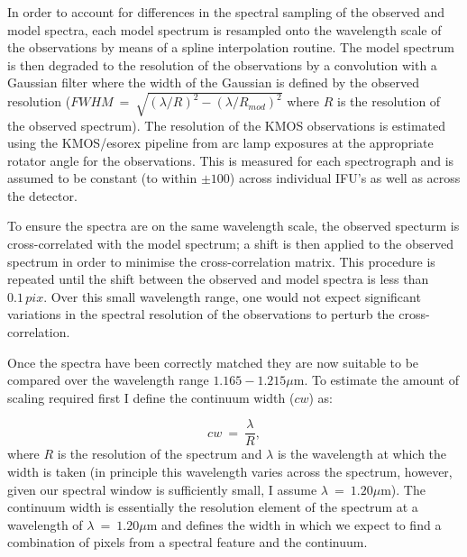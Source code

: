 In order to account for differences in the spectral sampling of the observed and model spectra,
each model spectrum is resampled onto the wavelength scale of the observations by means of a spline interpolation routine.
The model spectrum is then degraded to the resolution of the observations by a
convolution with a Gaussian filter where the width of the Gaussian is defined by the observed resolution ($FWHM~=~\sqrt{(\lambda/R)^{2} -(\lambda/R_{mod})^{2}}$ where $R$ is the resolution of the observed spectrum).
The resolution of the KMOS observations is estimated using the KMOS/esorex pipeline from arc lamp exposures at the appropriate rotator angle for the observations.
This is measured for each spectrograph and is assumed to be constant (to within $\pm 100$) across individual IFU's as well as across the detector.

To ensure the spectra are on the same wavelength scale, the observed specturm is cross-correlated with the model spectrum;
a shift is then applied to the observed spectrum in order to minimise the cross-correlation matrix.
This procedure is repeated until the shift between the observed and model spectra is less than $0.1\,pix$.
Over this small wavelength range, one would not expect significant variations in the spectral resolution of the observations to perturb the cross-correlation.

Once the spectra have been correctly matched they are now suitable to be compared over the wavelength range $1.165-1.215\mu$m.
To estimate the amount of scaling required first I define the continuum width ($cw$) as:

\begin{equation}
    cw~=~\frac{\lambda}{R}, %
\end{equation}
\noindent where $R$ is the resolution of the spectrum and
$\lambda$ is the wavelength at which the width is taken
(in principle this wavelength varies across the spectrum, however, given our spectral window is sufficiently small, I assume $\lambda~=~1.20\mu$m).
The continuum width is essentially the resolution element of the spectrum at a wavelength of
$\lambda~=~1.20\mu$m and defines the width in which we expect to find a combination of pixels from a spectral feature and the continuum.

